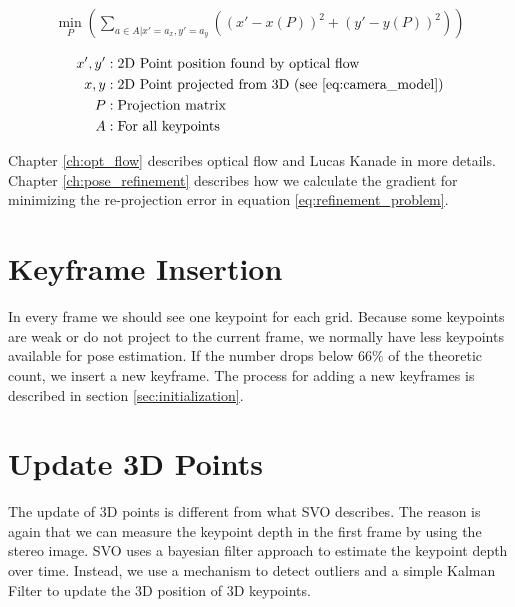 \documentclass[11pt,a4paper,titlepage,oneside]{report}
\begin{document}
\begin{equation}\label{eq:refinement_problem}
  \begin{gathered}
    \min_P(\sum_{a \in A|x'=a_x,y'=a_y}((x'-x(P))^2+(y'-y(P))^2))\\
  \end{gathered}
\end{equation}
\begin{align*}
  x',y'   &: \text{2D Point position found by optical flow}\\
  x,y     &: \text{2D Point projected from 3D (see \ref{eq:camera_model})}\\
  P       &: \text{Projection matrix}\\
  A       &: \text{For all keypoints}\\
\end{align*}

Chapter \ref{ch:opt_flow} describes optical flow and Lucas Kanade in more details. Chapter \ref{ch:pose_refinement} describes how we calculate the gradient for minimizing the re-projection error in equation \ref{eq:refinement_problem}.

\section{Keyframe Insertion}
In every frame we should see one keypoint for each grid. Because some keypoints are weak or do not project to the current frame, we normally have less keypoints available for pose estimation. If the number drops below 66\% of the theoretic count, we insert a new keyframe. The process for adding a new keyframes is described in section \ref{sec:initialization}.

\section{Update 3D Points}\label{sec:point_update}

The update of 3D points is different from what SVO \cite{svo} describes. The reason is again that we can measure the keypoint depth in the first frame by using the stereo image. SVO uses a bayesian filter approach to estimate the keypoint depth over time. Instead, we use a mechanism to detect outliers and a simple Kalman Filter to update the 3D position of 3D keypoints.
\end{document}
